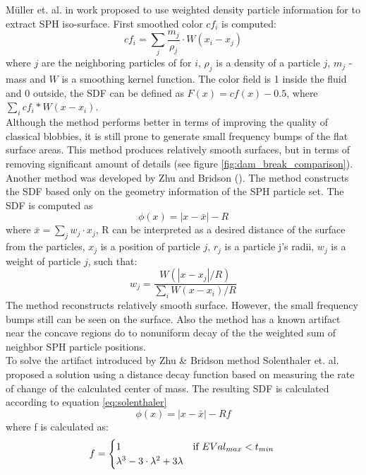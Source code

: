 Müller et. al. in work \cite{Muller} proposed to use weighted density particle information for to extract SPH iso-surface. First smoothed color $cf_i$ is computed:
\begin{equation}
	cf_i = \sum_j{\dfrac{m_j}{\rho_j} \cdot W(x_i - x_j)}
\end{equation}
where $j$ are the neighboring particles of for $i$, $\rho_j$ is a density of a particle $j$, $m_j$ - mass and $W$ is a smoothing kernel function. The color field is 1 inside the fluid and 0 outside, the SDF can be defined as $F(x) = cf(x) - 0.5$, where $\sum_i cf_i * W(x - x_i)$.\\
Although the method performs better in terms of improving the quality of classical blobbies, it is still prone to generate small frequency bumps of the flat surface areas. This method produces relatively smooth surfaces, but in terms of removing significant amount of details (see figure \ref{fig:dam_break_comparison}).\\
Another method was developed by Zhu and Bridson (\cite{ZhuBridson}). The method constructs the SDF based only on the geometry information of the SPH particle set. The SDF is computed as 
\begin{equation}
	\phi(x) = |x - \bar{x}| - R
\end{equation}
where $\bar{x} = \sum_j{w_j \cdot x_j}$, R can be interpreted as a desired distance of the
surface from the particles, $x_j$ is a position of particle $j$, $r_j$ is a particle j's radii, $w_j$ is a weight of particle $j$, such that:
\begin{equation}
	w_j = \dfrac{W(|x - x_j|/R)}{\sum_i{W(x - x_i)/R}}
\end{equation}
The method reconstructs relatively smooth surface. However, the small frequency bumps still can be seen on the surface. Also the method has a known artifact near the concave regions do to nonuniform decay of the the weighted sum of neighbor SPH particle positions.\\
To solve the artifact introduced by Zhu \& Bridson method Solenthaler et. al. \cite{Solenthaler} proposed a solution using a distance decay function based on measuring the rate of change of the calculated center of  mass. The resulting SDF is calculated according to equation \ref{eq:solenthaler}
\begin{equation}
	\phi(x) = |x - \bar{x}| - Rf
	\label{eq:solenthaler}
\end{equation}
where f is calculated as:
\begin{equation}
	f = 
	\begin{cases}
		1 & \text{if $EVal_{max} < t_{min}$}\\
		\lambda^3 -3\cdot\lambda^2 + 3\lambda
	\end{cases}\\
\end{equation}
